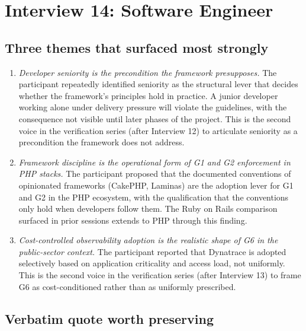 
\section{Interview 14: Software Engineer}
\label{sec:interview14}

\subsection*{Three themes that surfaced most strongly}

\begin{enumerate}[itemsep=8pt,topsep=2pt]
  \item \emph{Developer seniority is the precondition the framework presupposes.} The participant repeatedly identified seniority as the structural lever that decides whether the framework's principles hold in practice. A junior developer working alone under delivery pressure will violate the guidelines, with the consequence not visible until later phases of the project. This is the second voice in the verification series (after Interview 12) to articulate seniority as a precondition the framework does not address.

  \item \emph{Framework discipline is the operational form of G1 and G2 enforcement in PHP stacks.} The participant proposed that the documented conventions of opinionated frameworks (CakePHP, Laminas) are the adoption lever for G1 and G2 in the PHP ecosystem, with the qualification that the conventions only hold when developers follow them. The Ruby on Rails comparison surfaced in prior sessions extends to PHP through this finding.

  \item \emph{Cost-controlled observability adoption is the realistic shape of G6 in the public-sector context.} The participant reported that Dynatrace is adopted selectively based on application criticality and access load, not uniformly. This is the second voice in the verification series (after Interview 13) to frame G6 as cost-conditioned rather than as uniformly prescribed.
\end{enumerate}

\subsection*{Verbatim quote worth preserving}

